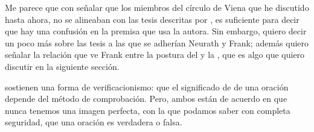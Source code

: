 Me parece que con señalar que los miembros del círculo de Viena que he discutido hasta ahora, no se alineaban con las tesis descritas por \parencite{Yturbe1995}, es suficiente para decir que hay una confusión en la premisa que usa la autora.
Sin embargo, quiero decir un poco más sobre las tesis a las que se adherían Neurath y Frank; además quiero señalar la relación que ve Frank entre la postura del  y la , que es algo que quiero discutir en la siguiente sección.

 sostienen una forma de verificacionismo: que el significado de de una oración depende del método de comprobación.
Pero, ambos están de acuerdo en que nunca tenemos una imagen perfecta, con la que podamos saber con completa seguridad, que una oración es verdadera o falsa.






